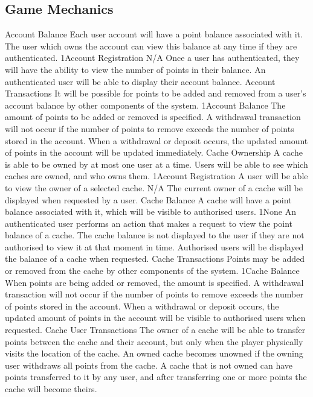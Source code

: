 	\subsection{Game Mechanics}
		\funcreq
			{Account Balance}
			{Each user account will have a point balance associated with it. The user which owns the account can view this balance at any time if they are authenticated.}
			{1}{Account Registration}
			{N/A}
			{Once a user has authenticated, they will have the ability to view the number of points in their balance.}
			{An authenticated user will be able to display their account balance.}
		\funcreq
			{Account Transactions}
			{It will be possible for points to be added and removed from a user's account balance by other components of the system.}
			{1}{Account Balance}
			{The amount of points to be added or removed is specified.}
			{A withdrawal transaction will not occur if the number of points to remove exceeds the number of points stored in the account.}
			{When a withdrawal or deposit occurs, the updated amount of points in the account will be updated immediately.}
		\funcreq
			{Cache Ownership}
			{A cache is able to be owned by at most one user at a time. Users will be able to see which caches are owned, and who owns them.}
			{1}{Account Registration}
			{A user will be able to view the owner of a selected cache.}
			{N/A}
			{The current owner of a cache will be displayed when requested by a user.}
		\funcreq
			{Cache Balance}
			{A cache will have a point balance associated with it, which will be visible to authorised users.}
			{1}{None}
			{An authenticated user performs an action that makes a request to view the point balance of a cache.}
			{The cache balance is not displayed to the user if they are not authorised to view it at that moment in time.}
			{Authorised users will be displayed the balance of a cache when requested.}
		\funcreq
			{Cache Transactions}
			{Points may be added or removed from the cache by other components of the system.}
			{1}{Cache Balance}
			{When points are being added or removed, the amount is specified.}
			{A withdrawal transaction will not occur if the number of points to remove exceeds the number of points stored in the account.}
			{When a withdrawal or deposit occurs, the updated amount of points in the account will be visible to authorised users when requested.}
		\funcreq
			{Cache User Transactions}
			{The owner of a cache will be able to transfer points between the cache and their account, but only when the player physically visits the location of the cache. An owned cache becomes unowned if the owning user withdraws all points from the cache. A cache that is not owned can have points transferred to it by any user, and after transferring one or more points the cache will become theirs.}

